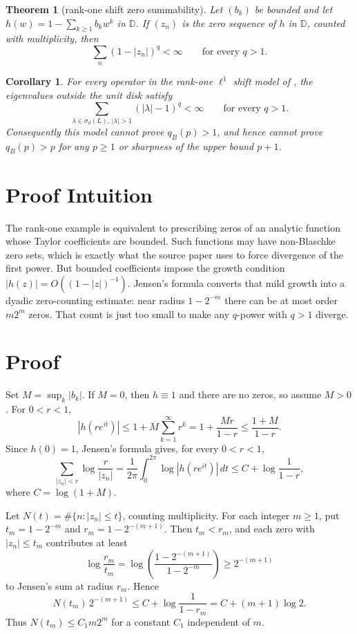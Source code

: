 \documentclass[11pt]{article}
\newtheorem{theorem}{Theorem}
\newtheorem{corollary}{Corollary}
\begin{document}
\begin{theorem}[rank-one shift zero summability]
Let $(b_k)$ be bounded and let
$h(w)=1-\sum_{k\ge1}b_k w^k$ in $\mathbb D$.  If $(z_n)$ is the zero
sequence of $h$ in $\mathbb D$, counted with multiplicity, then
\[
  \sum_n (1-|z_n|)^q <\infty
  \qquad\text{for every } q>1.
\]
\end{theorem}

\begin{corollary}
For every operator in the rank-one $\ell^1$ shift model of \cite[Section
5]{DHHK}, the eigenvalues outside the unit disk satisfy
\[
  \sum_{\lambda\in\sigma_d(L),\,|\lambda|>1} (|\lambda|-1)^q<\infty
  \qquad\text{for every } q>1.
\]
Consequently this model cannot prove $q_B(p)>1$, and hence cannot prove
$q_B(p)>p$ for any $p\ge1$ or sharpness of the upper bound $p+1$.
\end{corollary}

\section*{Proof Intuition}

The rank-one example is equivalent to prescribing zeros of an analytic
function whose Taylor coefficients are bounded.  Such functions may have
non-Blaschke zero sets, which is exactly what the source paper uses to force
divergence of the first power.  But bounded coefficients impose the growth
condition $|h(z)|=O((1-|z|)^{-1})$.  Jensen's formula converts that mild
growth into a dyadic zero-counting estimate: near radius $1-2^{-m}$ there
can be at most order $m2^m$ zeros.  That count is just too small to make
any $q$-power with $q>1$ diverge.

\section*{Proof}

Set $M=\sup_k |b_k|$.  If $M=0$, then $h\equiv1$ and there are no zeros, so
assume $M>0$.  For $0<r<1$,
\[
  |h(re^{it})|
  \le 1+M\sum_{k=1}^{\infty}r^k
  =1+\frac{Mr}{1-r}
  \le \frac{1+M}{1-r}.
\]
Since $h(0)=1$, Jensen's formula gives, for every $0<r<1$,
\[
  \sum_{|z_n|<r}\log\frac{r}{|z_n|}
  =
  \frac1{2\pi}\int_0^{2\pi}\log|h(re^{it})|\,dt
  \le C+\log\frac1{1-r},
\]
where $C=\log(1+M)$.

Let $N(t)=\#\{n:|z_n|\le t\}$, counting multiplicity.  For each integer
$m\ge1$, put $t_m=1-2^{-m}$ and $r_m=1-2^{-(m+1)}$.  Then $t_m<r_m$, and
each zero with $|z_n|\le t_m$ contributes at least
\[
  \log\frac{r_m}{t_m}
  =
  \log\left(\frac{1-2^{-(m+1)}}{1-2^{-m}}\right)
  \ge 2^{-(m+1)}
\]
to Jensen's sum at radius $r_m$.  Hence
\[
  N(t_m)\,2^{-(m+1)}
  \le C+\log\frac1{1-r_m}
  = C+(m+1)\log 2.
\]
Thus $N(t_m)\le C_1 m2^m$ for a constant $C_1$ independent of $m$.
\end{document}
